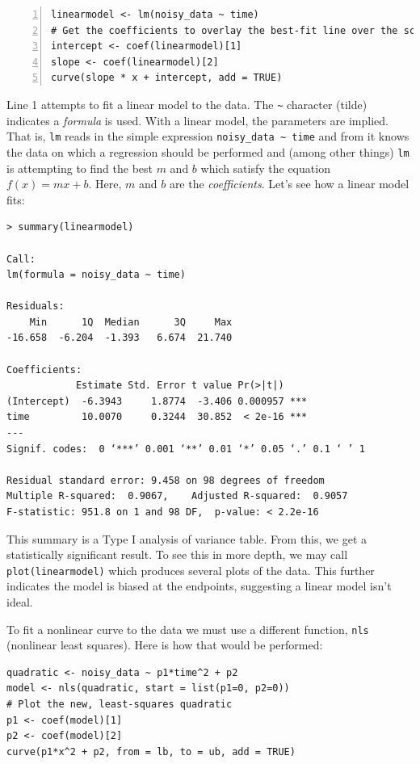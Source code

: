 \documentclass[12pt]{article}
\begin{document}
\begin{Verbatim}[frame=single, fontsize=\small, numbers=left]
linearmodel <- lm(noisy_data ~ time)
# Get the coefficients to overlay the best-fit line over the scatterplot
intercept <- coef(linearmodel)[1]
slope <- coef(linearmodel)[2]
curve(slope * x + intercept, add = TRUE)
\end{Verbatim}

Line 1 attempts to fit a linear model to the data. The \verb|~| character (tilde) indicates a \emph{formula} is used. With a linear model, the parameters are implied. That is, \verb|lm| reads in the simple expression \verb|noisy_data ~ time| and from it knows the data on which a regression should be performed and (among other things) \verb|lm| is attempting to find the best $m$ and $b$ which satisfy the equation $f(x) = mx + b$. Here, $m$ and $b$ are the \emph{coefficients}. Let's see how a linear model fits:

\begin{Verbatim}[frame=single, fontsize=\small]
> summary(linearmodel)

Call:
lm(formula = noisy_data ~ time)

Residuals:
    Min      1Q  Median      3Q     Max 
-16.658  -6.204  -1.393   6.674  21.740 

Coefficients:
            Estimate Std. Error t value Pr(>|t|)    
(Intercept)  -6.3943     1.8774  -3.406 0.000957 ***
time         10.0070     0.3244  30.852  < 2e-16 ***
---
Signif. codes:  0 ‘***’ 0.001 ‘**’ 0.01 ‘*’ 0.05 ‘.’ 0.1 ‘ ’ 1

Residual standard error: 9.458 on 98 degrees of freedom
Multiple R-squared:  0.9067,	Adjusted R-squared:  0.9057 
F-statistic: 951.8 on 1 and 98 DF,  p-value: < 2.2e-16
\end{Verbatim}
This summary is a Type I analysis of variance table. From this, we get a statistically significant result. To see this in more depth, we may call \verb|plot(linearmodel)| which produces several plots of the data. This further indicates the model is biased at the endpoints, suggesting a linear model isn't ideal.

To fit a nonlinear curve to the data we must use a different function, \verb|nls| (nonlinear least squares). Here is how that would be performed:
\begin{Verbatim}[frame=single, fontsize=\small]
quadratic <- noisy_data ~ p1*time^2 + p2
model <- nls(quadratic, start = list(p1=0, p2=0))
# Plot the new, least-squares quadratic
p1 <- coef(model)[1]
p2 <- coef(model)[2]
curve(p1*x^2 + p2, from = lb, to = ub, add = TRUE)
\end{Verbatim}
\end{document}
